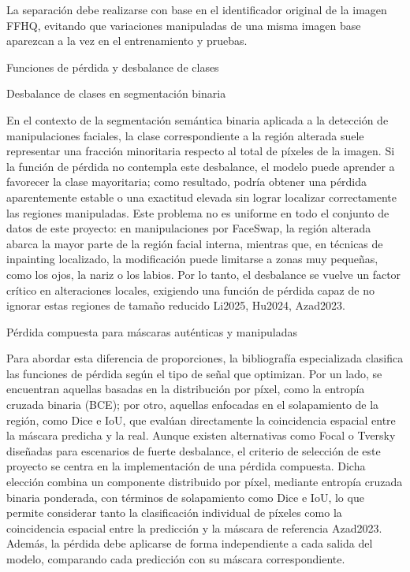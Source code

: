 {{{La separación debe realizarse con base en el identificador original de la imagen FFHQ, evitando que variaciones manipuladas de una misma imagen base aparezcan a la vez en el entrenamiento y pruebas. 

Funciones de pérdida y desbalance de clases

Desbalance de clases en segmentación binaria

En el contexto de la segmentación semántica binaria aplicada a la detección de manipulaciones faciales, la clase correspondiente a la región alterada suele representar una fracción minoritaria respecto al total de píxeles de la imagen. Si la función de pérdida no contempla este desbalance, el modelo puede aprender a favorecer la clase mayoritaria; como resultado, podría obtener una pérdida aparentemente estable o una exactitud elevada sin lograr localizar correctamente las regiones manipuladas. Este problema no es uniforme en todo el conjunto de datos de este proyecto: en manipulaciones por FaceSwap, la región alterada abarca la mayor parte de la región facial interna, mientras que, en técnicas de inpainting localizado, la modificación puede limitarse a zonas muy pequeñas, como los ojos, la nariz o los labios. Por lo tanto, el desbalance se vuelve un factor crítico en alteraciones locales, exigiendo una función de pérdida capaz de no ignorar estas regiones de tamaño reducido Li2025, Hu2024, Azad2023.

Pérdida compuesta para máscaras auténticas y manipuladas

Para abordar esta diferencia de proporciones, la bibliografía especializada clasifica las funciones de pérdida según el tipo de señal que optimizan. Por un lado, se encuentran aquellas basadas en la distribución por píxel, como la entropía cruzada binaria (BCE); por otro, aquellas enfocadas en el solapamiento de la región, como Dice e IoU, que evalúan directamente la coincidencia espacial entre la máscara predicha y la real. Aunque existen alternativas como Focal o Tversky diseñadas para escenarios de fuerte desbalance, el criterio de selección de este proyecto se centra en la implementación de una pérdida compuesta. Dicha elección combina un componente distribuido por píxel, mediante entropía cruzada binaria ponderada, con términos de solapamiento como Dice e IoU, lo que permite considerar tanto la clasificación individual de píxeles como la coincidencia espacial entre la predicción y la máscara de referencia Azad2023. Además, la pérdida debe aplicarse de forma independiente a cada salida del modelo, comparando cada predicción con su máscara correspondiente.

}}}
